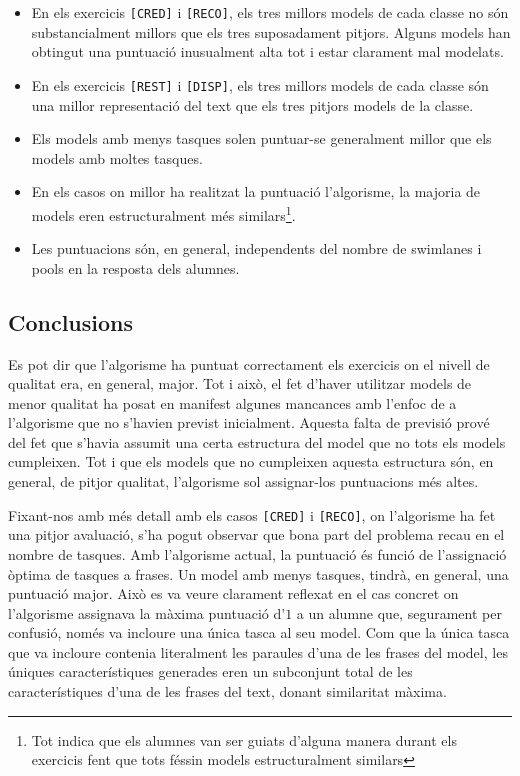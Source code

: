 \begin{itemize}
    \item En els exercicis \texttt{[CRED]} i \texttt{[RECO]}, els tres millors models de cada classe no són substancialment millors que els tres suposadament pitjors. Alguns models han obtingut una puntuació inusualment alta tot i estar clarament mal modelats.
    \item En els exercicis \texttt{[REST]} i \texttt{[DISP]}, els tres millors models de cada classe són una millor representació del text que els tres pitjors models de la classe.
    \item Els models amb menys tasques solen puntuar-se generalment millor que els models amb moltes tasques.
    \item En els casos on millor ha realitzat la puntuació l'algorisme, la majoria de models eren estructuralment més similars\footnote{Tot indica que els alumnes van ser guiats d'alguna manera durant els exercicis fent que tots féssin models estructuralment similars}.
    \item Les puntuacions són, en general, independents del nombre de swimlanes i pools en la resposta dels alumnes.
\end{itemize}

\subsection{Conclusions}

Es pot dir que l'algorisme ha puntuat correctament els exercicis on el nivell de qualitat era, en general, major. Tot i això, el fet d'haver utilitzar models de menor qualitat ha posat en manifest algunes mancances amb l'enfoc de a l'algorisme que no s'havien previst inicialment. Aquesta falta de previsió prové del fet que s'havia assumit una certa estructura del model que no tots els models cumpleixen. Tot i que els models que no cumpleixen aquesta estructura són, en general, de pitjor qualitat, l'algorisme sol assignar-los puntuacions més altes.

Fixant-nos amb més detall amb els casos \texttt{[CRED]} i \texttt{[RECO]}, on l'algorisme ha fet una pitjor avaluació, s'ha pogut observar que bona part del problema recau en el nombre de tasques. Amb l'algorisme actual, la puntuació és funció de l'assignació òptima de tasques a frases. Un model amb menys tasques, tindrà, en general, una puntuació major. Això es va veure clarament reflexat en el cas concret on l'algorisme assignava la màxima puntuació d'$1$ a un alumne que, segurament per confusió, només va incloure una única tasca al seu model. Com que la única tasca que va incloure contenia literalment les paraules d'una de les frases del model, les úniques característiques generades eren un subconjunt total de les característiques d'una de les frases del text, donant similaritat màxima.

